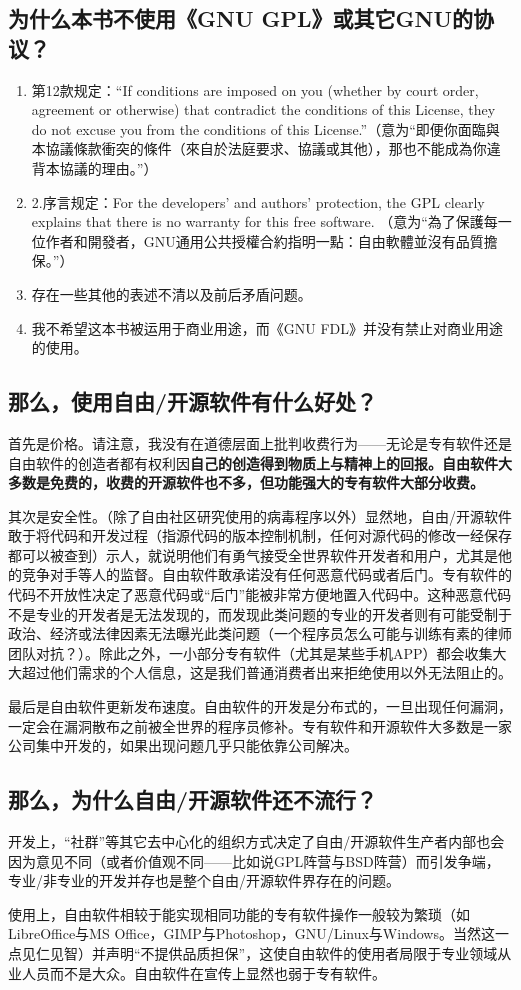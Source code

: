 \subsection{为什么本书不使用《GNU GPL》或其它GNU的协议？}
\begin{enumerate}
	\item 第12款规定：“If conditions are imposed on you (whether by court order, agreement or otherwise) that contradict the conditions of this License, they do not excuse you from the conditions of this License.”（意为“即便你面臨與本協議條款衝突的條件（來自於法庭要求、協議或其他），那也不能成為你違背本協議的理由。”）
	\item 2.序言规定：For the developers' and authors' protection, the GPL clearly explains that there is no warranty for this free software. （意为“為了保護每一位作者和開發者，GNU通用公共授權合約指明一點：自由軟體並沒有品質擔保。”）
	\item 存在一些其他的表述不清以及前后矛盾问题。
	\item 我不希望这本书被运用于商业用途，而《GNU FDL》并没有禁止对商业用途的使用。
\end{enumerate}
\subsection{那么，使用自由/开源软件有什么好处？}
首先是价格。请注意，我没有在道德层面上批判收费行为——无论是专有软件还是自由软件的创造者都有权利因\bf 自己的\normalall 创造得到物质上与精神上的回报。自由软件大多数是免费的，收费的开源软件也不多，但功能强大的专有软件大部分收费。\par
其次是安全性。（除了自由社区研究使用的病毒程序以外）显然地，自由/开源软件敢于将代码和开发过程（指源代码的版本控制机制，任何对源代码的修改一经保存都可以被查到）示人，就说明他们有勇气接受全世界软件开发者和用户，尤其是他的竞争对手等人的监督。自由软件敢承诺没有任何恶意代码或者后门。专有软件的代码不开放性决定了恶意代码或“后门”能被非常方便地置入代码中。这种恶意代码不是专业的开发者是无法发现的，而发现此类问题的专业的开发者则有可能受制于政治、经济或法律因素无法曝光此类问题（一个程序员怎么可能与训练有素的律师团队对抗？）。除此之外，一小部分专有软件（尤其是某些手机APP）都会收集大大超过他们需求的个人信息，这是我们普通消费者出来拒绝使用以外无法阻止的。\par
最后是自由软件更新发布速度。自由软件的开发是分布式的，一旦出现任何漏洞，一定会在漏洞散布之前被全世界的程序员修补。专有软件和开源软件大多数是一家公司集中开发的，如果出现问题几乎只能依靠公司解决。
\subsection{那么，为什么自由/开源软件还不流行？}
开发上，“社群”等其它去中心化的组织方式决定了自由/开源软件生产者内部也会因为意见不同（或者价值观不同——比如说GPL阵营与BSD阵营）而引发争端，专业/非专业的开发并存也是整个自由/开源软件界存在的问题。\par
使用上，自由软件相较于能实现相同功能的专有软件操作一般较为繁琐（如LibreOffice与MS Office，GIMP与Photoshop，GNU/Linux与Windows。当然这一点见仁见智）并声明“不提供品质担保”，这使自由软件的使用者局限于专业领域从业人员而不是大众。自由软件在宣传上显然也弱于专有软件。